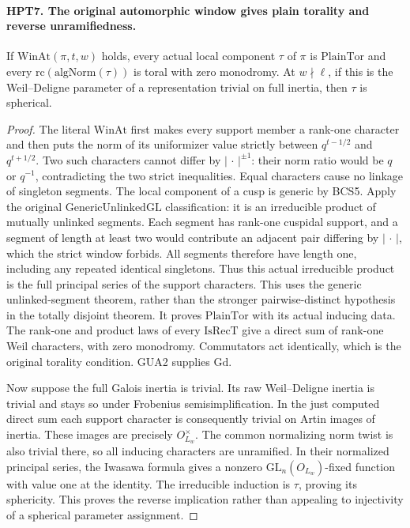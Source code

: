 \paragraph{HPT7. The original automorphic window gives plain torality and reverse unramifiedness.}
\label{claim:HPT7}
If $\mathrm{WinAt}(\pi,t,w)$ holds, every actual local component
$\tau$ of $\pi$ is $\mathrm{PlainTor}$ and every
$\mathrm{rc}(\mathrm{algNorm}(\tau))$ is toral with zero
monodromy.  At $w\nmid\ell$, if this is the Weil--Deligne
parameter of a representation trivial on full inertia, then
$\tau$ is spherical.
\begin{proof}
The literal $\mathrm{WinAt}$ first makes every support member a
rank-one character and then puts the norm of its uniformizer value
strictly between $q^{t-1/2}$ and $q^{t+1/2}$.  Two such characters
cannot differ by $|\,\cdot\,|^{\pm1}$: their norm ratio would be
$q$ or $q^{-1}$, contradicting the two strict inequalities.
Equal characters cause no linkage of singleton segments.
The local component of a cusp is generic by BCS5.  Apply the
original $\mathrm{GenericUnlinkedGL}$ classification: it is an
irreducible product of mutually unlinked segments.  Each segment
has rank-one cuspidal support, and a segment of length at least
two would contribute an adjacent pair differing by
$|\,\cdot\,|$, which the strict window forbids.  All segments
therefore have length one, including any repeated identical
singletons.  Thus this actual irreducible product is the full
principal series of the support characters.  This uses the
generic unlinked-segment theorem, rather than the stronger
pairwise-distinct hypothesis in the totally disjoint theorem.
It proves $\mathrm{PlainTor}$
with its actual inducing data.  The rank-one and product laws of
every $\mathrm{IsRecT}$ give a direct sum of rank-one Weil
characters, with zero monodromy.  Commutators act identically,
which is the original torality condition.  GUA2 supplies $\mathrm{Gd}$.

Now suppose the full Galois inertia is trivial.  Its raw
Weil--Deligne inertia is trivial and stays so under Frobenius
semisimplification.  In the just computed direct sum each support
character is consequently trivial on Artin images of inertia.
These images are precisely $O_{L_w}^\times$.  The common
normalizing norm twist is also trivial there, so all inducing
characters are unramified.  In their normalized principal series,
the Iwasawa formula gives a nonzero $\mathrm{GL}_n(O_{L_w})$-fixed
function with value one at the identity.  The irreducible induction
is $\tau$, proving its sphericity.  This proves the reverse
implication rather than appealing to injectivity of a spherical
parameter assignment.
\end{proof}

